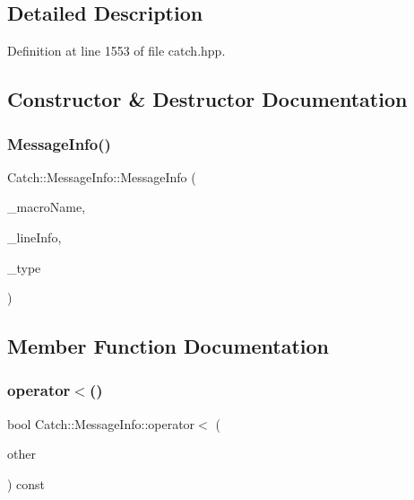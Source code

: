 \subsection{Detailed Description}


Definition at line 1553 of file catch.\+hpp.



\subsection{Constructor \& Destructor Documentation}
\mbox{\label{struct_catch_1_1_message_info_a2e336c33ebef7af3c1bbae6a56e14f8a}} 
\subsubsection{\texorpdfstring{Message\+Info()}{MessageInfo()}}
{\footnotesize\ttfamily Catch\+::\+Message\+Info\+::\+Message\+Info (\begin{DoxyParamCaption}\item[{std\+::string const \&}]{\+\_\+macro\+Name,  }\item[{\mbox{\hyperlink{struct_catch_1_1_source_line_info}{Source\+Line\+Info}} const \&}]{\+\_\+line\+Info,  }\item[{\mbox{\hyperlink{struct_catch_1_1_result_was_a624e1ee3661fcf6094ceef1f654601ef}{Result\+Was\+::\+Of\+Type}}}]{\+\_\+type }\end{DoxyParamCaption})}



\subsection{Member Function Documentation}
\mbox{\label{struct_catch_1_1_message_info_a8254cb8fca2da02a29a9843cdcb79df1}} 
\subsubsection{\texorpdfstring{operator$<$()}{operator<()}}
{\footnotesize\ttfamily bool Catch\+::\+Message\+Info\+::operator$<$ (\begin{DoxyParamCaption}\item[{\mbox{\hyperlink{struct_catch_1_1_message_info}{Message\+Info}} const \&}]{other }\end{DoxyParamCaption}) const}

